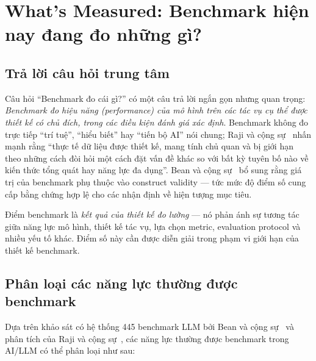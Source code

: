 %

\section{What's Measured: Benchmark hiện nay đang đo những gì?}
\label{sec:whats_measured}

\subsection{Trả lời câu hỏi trung tâm}

Câu hỏi ``Benchmark đo cái gì?'' có một câu trả lời ngắn gọn nhưng quan trọng: \textit{Benchmark đo hiệu năng (performance) của mô hình trên các tác vụ cụ thể được thiết kế có chủ đích, trong các điều kiện đánh giá xác định}. Benchmark không đo trực tiếp ``trí tuệ'', ``hiểu biết'' hay ``tiến bộ AI'' nói chung; Raji và cộng sự~\cite{everything_benchmark} nhấn mạnh rằng ``thực tế dữ liệu được thiết kế, mang tính chủ quan và bị giới hạn theo những cách đòi hỏi một cách đặt vấn đề khác so với bất kỳ tuyên bố nào về kiến thức tổng quát hay năng lực đa dụng''. Bean và cộng sự~\cite{measuring_what_matters} bổ sung rằng giá trị của benchmark phụ thuộc vào construct validity --- tức mức độ điểm số cung cấp bằng chứng hợp lệ cho các nhận định về hiện tượng mục tiêu.

Điểm benchmark là \textit{kết quả của thiết kế đo lường} --- nó phản ánh sự tương tác giữa năng lực mô hình, thiết kế tác vụ, lựa chọn metric, evaluation protocol và nhiều yếu tố khác. Điểm số này cần được diễn giải trong phạm vi giới hạn của thiết kế benchmark.

\subsection{Phân loại các năng lực thường được benchmark}

Dựa trên khảo sát có hệ thống 445 benchmark LLM bởi Bean và cộng sự~\cite{measuring_what_matters} và phân tích của Raji và cộng sự~\cite{everything_benchmark}, các năng lực thường được benchmark trong AI/LLM có thể phân loại như sau:

